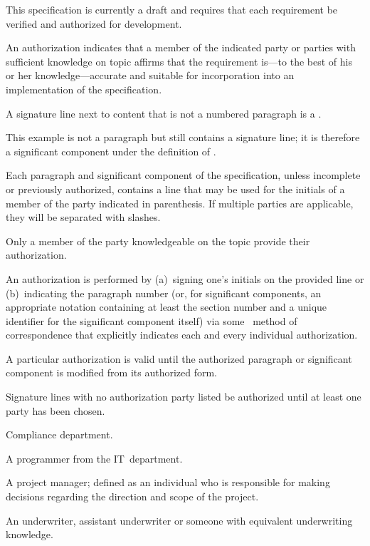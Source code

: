 

\label{s:authorize}

This specification is currently a draft and requires that each requirement be
verified and authorized for development.

An authorization indicates that a member of the indicated party or parties with
sufficient knowledge on topic affirms that the requirement is---to the best of
his or her knowledge---accurate and suitable for incorporation into an
implementation of the specification.

 A signature line next to content that is not a numbered paragraph
is a .

\begin{ex}
  \signline
  This example is not a paragraph but still contains a signature line; it is
  therefore a significant component under the definition of .
\end{ex}

Each paragraph and significant component of the specification, unless incomplete
or previously authorized, contains a line that may be used for the initials of a
member of the party indicated in parenthesis. If multiple parties are
applicable, they will be separated with slashes.

Only a member of the party knowledgeable on the topic \shall provide their
authorization.

An authorization is performed by (a)~signing one's initials on the provided line
or (b)~indicating the paragraph number (or, for significant components, an
appropriate notation containing at least the section number and a unique
identifier for the significant component itself) via some \unspecified\ method
of correspondence that explicitly indicates each and every individual
authorization.

A particular authorization is valid until the authorized paragraph or significant
component is modified from its authorized form.

Signature lines with no authorization party listed \shallnot be authorized until
at least one party has been chosen.

\goodbreak
\begin{description}
  Compliance department.

  A programmer from the IT~department.

  A project manager; defined as an individual who is responsible for making
  decisions regarding the direction and scope of the project.

  An underwriter, assistant underwriter or someone with equivalent underwriting
  knowledge.
\end{description}


\enddeptgroup
